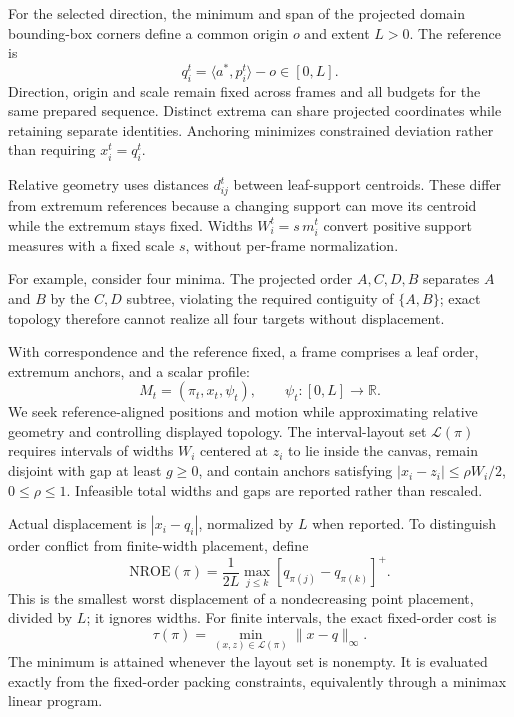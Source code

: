 \documentclass[review]{vgtc}
\newcommand{\nroe}{\mathrm{NROE}}
\begin{document}
For the selected direction, the minimum and span of the projected domain bounding-box corners define a common origin $o$ and extent $L>0$. The reference is
\begin{equation}\label{eq:reference}
 q_i^t=\langle a^*,p_i^t\rangle-o\in[0,L].
\end{equation}
Direction, origin and scale remain fixed across frames and all budgets for the same prepared sequence. Distinct extrema can share projected coordinates while retaining separate identities. Anchoring minimizes constrained deviation rather than requiring $x_i^t=q_i^t$.

Relative geometry uses distances $d_{ij}^t$ between leaf-support centroids. These differ from extremum references because a changing support can move its centroid while the extremum stays fixed. Widths $W_i^t=s\,m_i^t$ convert positive support measures with a fixed scale $s$, without per-frame normalization.

For example, consider four minima. The projected order $A,C,D,B$ separates $A$ and $B$ by the $C,D$ subtree, violating the required contiguity of $\{A,B\}$; exact topology therefore cannot realize all four targets without displacement.

With correspondence and the reference fixed, a frame comprises a leaf order, extremum anchors, and a scalar profile:
\begin{equation}\label{eq:mapframe}
 M_t=(\pi_t,x_t,\psi_t),\qquad\psi_t:[0,L]\to\mathbb{R}.
\end{equation}
We seek reference-aligned positions and motion while approximating relative geometry and controlling displayed topology. The interval-layout set $\mathcal{L}(\pi)$ requires intervals of widths $W_i$ centered at $z_i$ to lie inside the canvas, remain disjoint with gap at least $g\ge0$, and contain anchors satisfying $|x_i-z_i|\le\rho W_i/2$, $0\le\rho\le1$. Infeasible total widths and gaps are reported rather than rescaled.

Actual displacement is $|x_i-q_i|$, normalized by $L$ when reported. To distinguish order conflict from finite-width placement, define
\begin{equation}\label{eq:nroe}
 \nroe(\pi)=\frac{1}{2L}\max_{j\le k}
                      [q_{\pi(j)}-q_{\pi(k)}]^+.
\end{equation}
This is the smallest worst displacement of a nondecreasing point placement, divided by $L$; it ignores widths. For finite intervals, the exact fixed-order cost is
\begin{equation}\label{eq:tau}
 \tau(\pi)=\min_{(x,z)\in\mathcal{L}(\pi)}\|x-q\|_\infty.
\end{equation}
The minimum is attained whenever the layout set is nonempty. It is evaluated exactly from the fixed-order packing constraints, equivalently through a minimax linear program.
\end{document}
